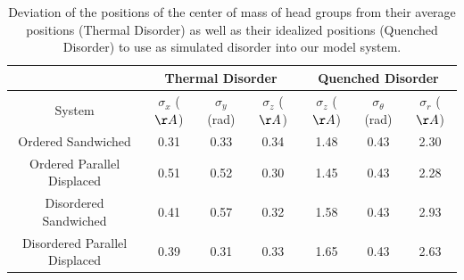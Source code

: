 \documentclass[journal=jpcbfk,manuscript=article]{achemso}
\begin{document}
  \begin{table}[h]
  \centering
  \begin{tabular}{c|ccc|ccc}
  \toprule
   		                        &           \multicolumn{3}{c}{Thermal Disorder}             &             \multicolumn{3}{c}{Quenched Disorder}               \\
  \midrule
  System                        & $\sigma_x$ ($\AA$) & $\sigma_y$ (rad) & $\sigma_z$ ($\AA$) & $\sigma_z$ ($\AA$) & $\sigma_\theta$ (rad) & $\sigma_r$ ($\AA$) \\
  \midrule
  Ordered Sandwiched            &         0.31       &       0.33       &        0.34        &        1.48        &     0.43              &     2.30           \\
  Ordered Parallel Displaced    &         0.51       &       0.52       &        0.30        &        1.45        &     0.43              &     2.28           \\ 
  Disordered Sandwiched         &         0.41       &       0.57       &        0.32        &        1.58        &     0.43              &     2.93           \\
  Disordered Parallel Displaced &         0.39       &       0.31       &        0.33        &        1.65        &     0.43              &     2.63           \\
  \bottomrule
  \end{tabular}
  \caption{Deviation of the positions of the center of mass of head groups from their average
  positions (Thermal Disorder) as well as their idealized positions (Quenched Disorder) to use 
  as simulated disorder into our model system.}
  \label{table:quenched_disorder} 
  \end{table}
  
\end{document}
